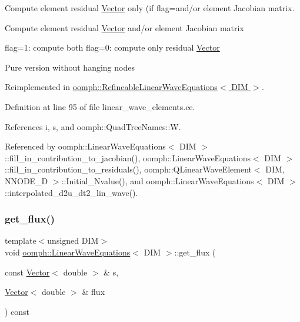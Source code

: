 Compute element residual \hyperlink{classoomph_1_1Vector}{Vector} only (if flag=and/or element Jacobian matrix. 

Compute element residual \hyperlink{classoomph_1_1Vector}{Vector} and/or element Jacobian matrix

flag=1\+: compute both flag=0\+: compute only residual \hyperlink{classoomph_1_1Vector}{Vector}

Pure version without hanging nodes 

Reimplemented in \hyperlink{classoomph_1_1RefineableLinearWaveEquations_a0521c661521a3934edd4c25733196932}{oomph\+::\+Refineable\+Linear\+Wave\+Equations$<$ D\+I\+M $>$}.



Definition at line 95 of file linear\+\_\+wave\+\_\+elements.\+cc.



References i, s, and oomph\+::\+Quad\+Tree\+Names\+::W.



Referenced by oomph\+::\+Linear\+Wave\+Equations$<$ D\+I\+M $>$\+::fill\+\_\+in\+\_\+contribution\+\_\+to\+\_\+jacobian(), oomph\+::\+Linear\+Wave\+Equations$<$ D\+I\+M $>$\+::fill\+\_\+in\+\_\+contribution\+\_\+to\+\_\+residuals(), oomph\+::\+Q\+Linear\+Wave\+Element$<$ D\+I\+M, N\+N\+O\+D\+E\+\_\+D $>$\+::\+Initial\+\_\+\+Nvalue(), and oomph\+::\+Linear\+Wave\+Equations$<$ D\+I\+M $>$\+::interpolated\+\_\+d2u\+\_\+dt2\+\_\+lin\+\_\+wave().

\mbox{\label{classoomph_1_1LinearWaveEquations_a36ca5b4691a27beacd433a4f5279e1bf}} 
\subsubsection{\texorpdfstring{get\+\_\+flux()}{get\_flux()}}
{\footnotesize\ttfamily template$<$unsigned D\+IM$>$ \\
void \hyperlink{classoomph_1_1LinearWaveEquations}{oomph\+::\+Linear\+Wave\+Equations}$<$ D\+IM $>$\+::get\+\_\+flux (\begin{DoxyParamCaption}\item[{const \hyperlink{classoomph_1_1Vector}{Vector}$<$ double $>$ \&}]{s,  }\item[{\hyperlink{classoomph_1_1Vector}{Vector}$<$ double $>$ \&}]{flux }\end{DoxyParamCaption}) const\hspace{0.3cm}{\ttfamily [inline]}}



